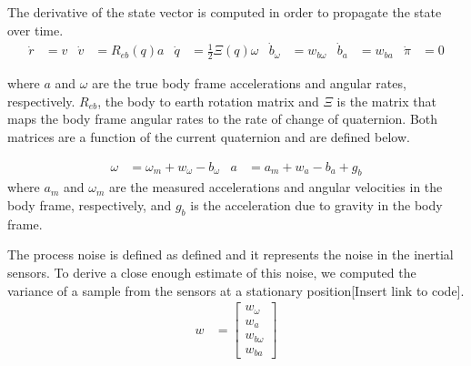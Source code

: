 \documentclass[]{article}
\begin{document}
{The derivative of the state vector is computed in order to propagate the state over time.
\begin{align}
	\dot{r} &= v
	&
	\dot{v} &= R_{eb}(q) a
	&
	\dot{q} &= \frac{1}{2}\Xi(q) \omega
	&
	\dot{b}_\omega &= w_{b\omega}
	&
	\dot{b}_a &= w_{ba}
	&
	\dot{\pi} &= 0
\end{align}

where $a$ and $\omega$ are the true body frame accelerations and angular rates, respectively.
$R_{eb}$, the body to earth rotation matrix and $\Xi$ is the matrix that maps the body frame angular rates to the rate of change of quaternion. Both matrices are a function of the current quaternion and are defined below.

\begin{align}
	\omega &= \omega_m + w_\omega - b_\omega &
	a &= a_m + w_a - b_a + g_b
\end{align}
where $a_m$ and $\omega_m$ are the measured accelerations and angular velocities in the body frame, respectively, and $g_b$ is the acceleration due to gravity in the body frame.

The process noise is defined as defined and it represents the noise in the inertial sensors. To derive a close enough estimate of this noise, we computed the variance of a sample from the sensors at a stationary position[Insert link to code].
\begin{align}
	w &= 
	\left[
	\begin{matrix}
		w_\omega \\
		w_a \\
		w_{b\omega} \\
		w_{ba}
	\end{matrix}
	\right]
\end{align}

}
\end{document}
